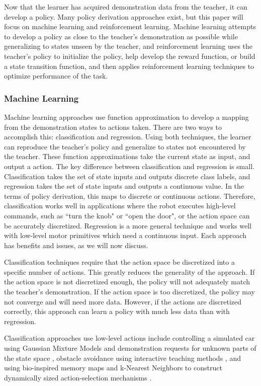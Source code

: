 \documentclass{article}
\begin{document}
Now that the learner has acquired demonstration data from the teacher, it can develop a policy. Many policy derivation approaches exist, but this paper will focus on machine learning and reinforcement learning. Machine learning attempts to develop a policy as close to the teacher's demonstration as possible while generalizing to states unseen by the teacher, and reinforcement learning uses the teacher's policy to initialize the policy, help develop the reward function, or build a state transition function, and then applies reinforcement learning techniques to optimize performance of the task.

\subsubsection{Machine Learning} \label{sec:PD:Regression}
Machine learning approaches use function approximation to develop a mapping from the demonstration states to actions taken. There are two ways to accomplish this: classification and regression. Using both techniques, the learner can reproduce the teacher's policy and generalize to states not encountered by the teacher. These function approximations take the current state as input, and output a action. The key difference between classification and regression is small. Classification takes the set of state inputs and outputs discrete class labels, and regression takes the set of state inputs and outputs a continuous value. In the terms of policy derivation, this maps to discrete or continuous actions. Therefore, classification works well in applications where the robot executes high-level commands, such as ``turn the knob" or ``open the door", or the action space can be accurately discretized. Regression is a more general technique and works well with low-level motor primitives which need a continuous input. Each approach has benefits and issues, as we will now discuss.

Classification techniques require that the action space be discretized into a specific number of actions. This greatly reduces the generality of the approach. If the action space is not discretized enough, the policy will not adequately match the teacher's demonstration. If the action space is too discretized, the policy may not converge and will need more data. However, if the actions are discretized correctly, this approach can learn a policy with much less data than with regression.

Classification approaches use low-level actions include controlling a simulated car using Gaussian Mixture Models and demonstration requests for unknown parts of the state space \cite{Chernova:2007:CPL:1329125.1329407}, obstacle avoidance using interactive teaching methods \cite{Inamura}, and using bio-inspired memory maps and k-Nearest Neighbors to construct dynamically sized action-selection mechanisms \cite{Saunders06teachingrobots}.
\end{document}
